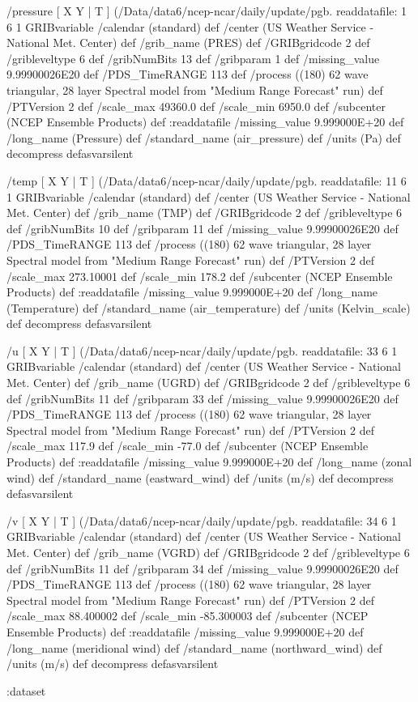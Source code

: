 \begin{ingrid}
  /pressure { [ X Y | T ] (/Data/data6/ncep-ncar/daily/update/pgb.%
  readdatafile:
  1 6 1 GRIBvariable
  /calendar (standard) def
  /center (US Weather Service - National Met. Center) def
  /grib_name (PRES) def
  /GRIBgridcode 2 def
  /gribleveltype 6 def
  /gribNumBits 13 def
  /gribparam 1 def
  /missing_value 9.99900026E20 def
  /PDS_TimeRANGE 113 def
  /process ((180) 62 wave triangular, 28 layer Spectral model from "Medium Range Forecast" run) def
  /PTVersion 2 def
  /scale_max 49360.0 def
  /scale_min 6950.0 def
  /subcenter (NCEP Ensemble Products) def
  :readdatafile
  /missing_value 9.999000E+20 def
  /long_name (Pressure) def
  /standard_name (air_pressure) def
  /units (Pa) def
  decompress
  } defasvarsilent

  /temp { [ X Y | T ] (/Data/data6/ncep-ncar/daily/update/pgb.%
  readdatafile:
  11 6 1 GRIBvariable
  /calendar (standard) def
  /center (US Weather Service - National Met. Center) def
  /grib_name (TMP) def
  /GRIBgridcode 2 def
  /gribleveltype 6 def
  /gribNumBits 10 def
  /gribparam 11 def
  /missing_value 9.99900026E20 def
  /PDS_TimeRANGE 113 def
  /process ((180) 62 wave triangular, 28 layer Spectral model from "Medium Range Forecast" run) def
  /PTVersion 2 def
  /scale_max 273.10001 def
  /scale_min 178.2 def
  /subcenter (NCEP Ensemble Products) def
  :readdatafile
  /missing_value 9.999000E+20 def
  /long_name (Temperature) def
  /standard_name (air_temperature) def
  /units (Kelvin_scale) def
  decompress
  } defasvarsilent

  /u { [ X Y | T ] (/Data/data6/ncep-ncar/daily/update/pgb.%
  readdatafile:
  33 6 1 GRIBvariable
  /calendar (standard) def
  /center (US Weather Service - National Met. Center) def
  /grib_name (UGRD) def
  /GRIBgridcode 2 def
  /gribleveltype 6 def
  /gribNumBits 11 def
  /gribparam 33 def
  /missing_value 9.99900026E20 def
  /PDS_TimeRANGE 113 def
  /process ((180) 62 wave triangular, 28 layer Spectral model from "Medium Range Forecast" run) def
  /PTVersion 2 def
  /scale_max 117.9 def
  /scale_min -77.0 def
  /subcenter (NCEP Ensemble Products) def
  :readdatafile
  /missing_value 9.999000E+20 def
  /long_name (zonal wind) def
  /standard_name (eastward_wind) def
  /units (m/s) def
  decompress
  } defasvarsilent

  /v { [ X Y | T ] (/Data/data6/ncep-ncar/daily/update/pgb.%
  readdatafile:
  34 6 1 GRIBvariable
  /calendar (standard) def
  /center (US Weather Service - National Met. Center) def
  /grib_name (VGRD) def
  /GRIBgridcode 2 def
  /gribleveltype 6 def
  /gribNumBits 11 def
  /gribparam 34 def
  /missing_value 9.99900026E20 def
  /PDS_TimeRANGE 113 def
  /process ((180) 62 wave triangular, 28 layer Spectral model from "Medium Range Forecast" run) def
  /PTVersion 2 def
  /scale_max 88.400002 def
  /scale_min -85.300003 def
  /subcenter (NCEP Ensemble Products) def
  :readdatafile
  /missing_value 9.999000E+20 def
  /long_name (meridional wind) def
  /standard_name (northward_wind) def
  /units (m/s) def
  decompress
  } defasvarsilent

 :dataset

\end{ingrid}

